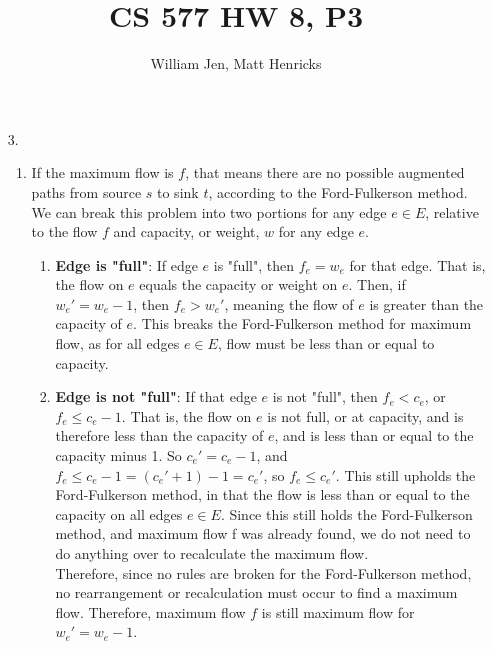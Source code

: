 \documentclass{article}
\title{CS 577 HW 8, P3}
\author{William Jen, Matt Henricks}
\date{}
\begin{document}
\maketitle


\begin{enumerate}
    \item[3.]
        \begin{enumerate}
            \item
            If the maximum flow is $f$, that means there are no possible augmented paths from source $s$ to sink $t$, according to the Ford-Fulkerson method. \\
            
            We can break this problem into two portions for any edge $e \in E$, relative to the flow $f$ and capacity, or weight, $w$ for any edge $e$.
        
            \begin{enumerate}
                \item \textbf{Edge is "full"}:
                If edge $e$ is "full", then $f_e = w_e$ for that edge. That is, the flow on $e$ equals the capacity or weight on $e$. Then, if $w_e'=w_e - 1$, then $f_e > w_e'$, meaning the flow of $e$ is greater than the capacity of $e$. This breaks the Ford-Fulkerson method for maximum flow, as for all edges $e \in E$, flow must be less than or equal to capacity.
                
                \item \textbf{Edge is not "full"}:
                If that edge $e$ is not "full", then $f_e < c_e$, or $f_e \leq c_e - 1$. That is, the flow on $e$ is not full, or at capacity, and is therefore less than the capacity of $e$, and is less than or equal to the capacity minus 1. So $c_e' = c_e - 1$, and $f_e \leq c_e - 1 = (c_e' + 1) - 1 = c_e'$, so $f_e \leq c_e'$. This still upholds the Ford-Fulkerson method, in that the flow is less than or equal to the capacity on all edges $e \in E$. Since this still holds the Ford-Fulkerson method, and maximum flow f was already found, we do not need to do anything over to recalculate the maximum flow. \\
        
                Therefore, since no rules are broken for the Ford-Fulkerson method, no rearrangement or recalculation must occur to find a maximum flow. Therefore, maximum flow $f$ is still maximum flow for $w_e' = w_e - 1$.
        
            \end{enumerate}
            

\end{enumerate}
\end{enumerate}
\end{document}
